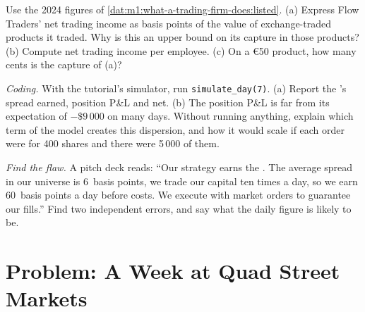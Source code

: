 \begin{exercise}[$\star\star$]\label{exo:m1:what-a-trading-firm-does:6}
Use the 2024 figures of
\cref{dat:m1:what-a-trading-firm-does:listed}. (a) Express Flow Traders' net
trading income as basis points of the value of exchange-traded products it
traded. Why is this an upper bound on its capture in those products?
(b) Compute net trading income per employee. (c) On a \euro 50 product, how
many cents is the capture of (a)?
\end{exercise}

\begin{exercise}[$\star\star\star$]\label{exo:m1:what-a-trading-firm-does:7}
\emph{Coding.} With the tutorial's simulator, run \texttt{simulate\_day(7)}.
(a) Report the 's spread earned, position P\&L and net. (b) The
position P\&L is far from its expectation of $-\$9\,000$ on many days.
Without running anything, explain which term of the model creates this
dispersion, and how it would scale if each order were for 400 shares and
there were 5\,000 of them.
\end{exercise}

\begin{exercise}[$\star\star\star$]\label{exo:m1:what-a-trading-firm-does:8}
\emph{Find the flaw.} A pitch deck reads: ``Our strategy earns the . The average spread in our universe is 6~basis points, we trade our
capital ten times a day, so we earn 60~basis points a day before costs. We
execute with market orders to guarantee our fills.'' Find two independent
errors, and say what the daily figure is likely to be.
\end{exercise}

\section{Problem: A Week at Quad Street Markets}

